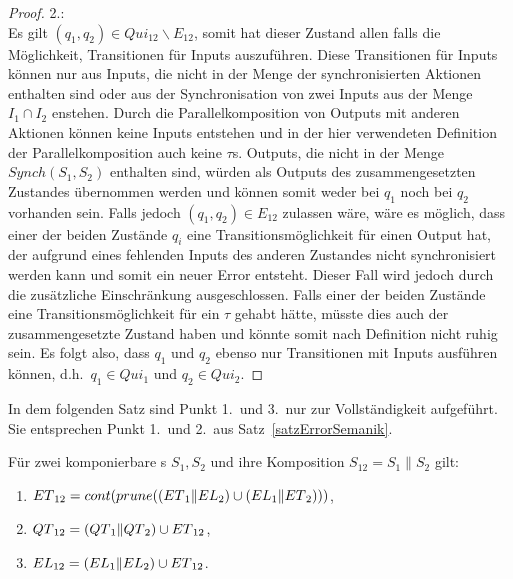 \begin{proof}
  2.:\\
  Es gilt $(q_1,q_2)\in Qui_{12}\backslash E_{12}$, somit hat
  dieser Zustand allen falls die Möglichkeit, Transitionen für Inputs auszuführen.
  Diese Transitionen für Inputs können nur aus Inputs, die nicht in der Menge
  der synchronisierten Aktionen enthalten sind oder aus der Synchronisation
  von zwei Inputs aus der Menge $I_1\cap I_2$ enstehen. Durch die
  Parallelkomposition von Outputs mit anderen Aktionen können keine Inputs
  entstehen und in der hier verwendeten Definition der Parallelkomposition auch
  keine $\tau$s. Outputs, die nicht in der Menge $Synch(S_1,S_2)$ enthalten sind,
  würden als Outputs des zusammengesetzten Zustandes übernommen werden und
  können somit weder bei $q_1$ noch bei $q_2$ vorhanden sein. Falls jedoch
  $(q_1,q_2)\in E_{12}$ zulassen wäre, wäre es möglich, dass einer der beiden
  Zustände $q_i$ eine Transitionsmöglichkeit für einen Output hat, der aufgrund
  eines fehlenden Inputs des anderen Zustandes nicht synchronisiert werden kann
  und somit ein neuer Error entsteht. Dieser Fall wird jedoch durch die
  zusätzliche Einschränkung ausgeschlossen. Falls einer der beiden Zustände
  eine Transitionsmöglichkeit für ein $\tau$ gehabt hätte, müsste dies auch der
  zusammengesetzte Zustand haben und könnte somit nach Definition
  nicht ruhig sein. Es folgt also, dass $q_1$ und $q_2$ ebenso nur
  Transitionen mit Inputs ausführen können, d.h.\ $q_1\in Qui_1$ und
  $q_2\in Qui_2$.
\end{proof}

In dem folgenden Satz sind Punkt 1.\ und 3.\ nur zur Vollständigkeit aufgeführt.
Sie entsprechen Punkt 1.\ und 2.\ aus Satz~\ref{satzErrorSemanik}.

\begin{satz}
  \label{satzQuiSemantik}
  Für zwei komponierbare \EIO{}s $S_1, S_2$ und ihre Komposition $S_{12} =
  S_1\|S_2$ gilt:
  \begin{enumerate}
    \item $ET{}_{12} = cont{}(prune{}((ET{}_1\|EL{}_2)\cup
      (EL{}_1\|ET{}_2)))$,
    \item $QT{}_{12} = (QT{}_1\|QT{}_2)\cup ET{}_{12}$,
    \item $EL{}_{12} = (EL{}_1\|EL{}_2)\cup ET{}_{12}$.
  \end{enumerate}
\end{satz}

